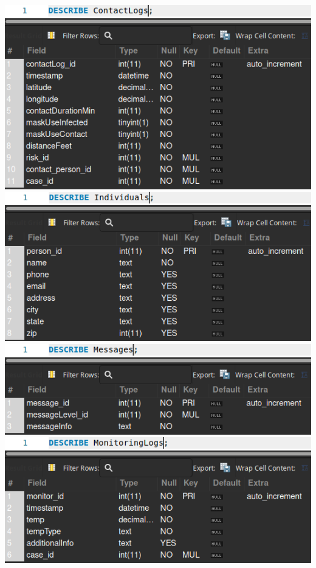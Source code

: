 \documentclass[
]{article}
\begin{document}
\includegraphics{imgs/Describe_ContactLogs.png}\\
\includegraphics{imgs/Describe_Individuals.png}\\
\includegraphics{imgs/Describe_Messages.png}\\
\includegraphics{imgs/Describe_MonitoringLogs.png}\\
\end{document}
